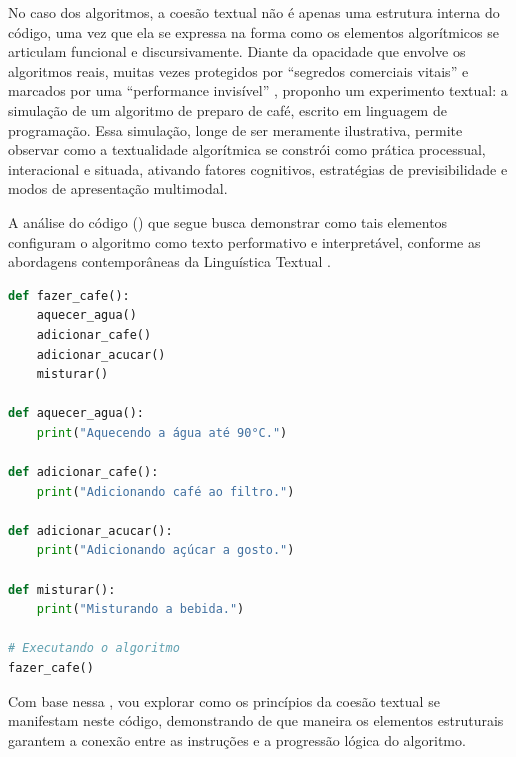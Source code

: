 \documentclass[portuguese]{textolivre}
\begin{document}
No caso dos algoritmos, a coesão textual não é apenas uma estrutura interna do código, uma vez que  ela se expressa na forma como os elementos algorítmicos se articulam funcional e discursivamente. Diante da opacidade que envolve os algoritmos reais, muitas vezes protegidos por “segredos comerciais vitais” \cite[p. 208]{oneil2020} e marcados por uma “performance invisível” \cite[p. 12]{santaella2023}, proponho um experimento textual: a simulação de um algoritmo de preparo de café, escrito em linguagem de programação. Essa simulação, longe de ser meramente ilustrativa, permite observar como a textualidade algorítmica se constrói como prática processual, interacional e situada, ativando fatores cognitivos, estratégias de previsibilidade e modos de apresentação multimodal.

A análise do código () que segue busca demonstrar como tais elementos configuram o algoritmo como texto performativo e interpretável, conforme as abordagens contemporâneas da Linguística Textual \cite{koch2006,marcuschi2008,beaugrande1997}.


\begin{lstlisting}[language=Python, label=fig2, caption={Algoritmo de preparo de café representado em linguagem de programação.}, source={Elaborado pelo autor via simulação por IA.}]
def fazer_cafe():
    aquecer_agua()
    adicionar_cafe()
    adicionar_acucar()
    misturar()

def aquecer_agua():
    print("Aquecendo a água até 90°C.")

def adicionar_cafe():
    print("Adicionando café ao filtro.")

def adicionar_acucar():
    print("Adicionando açúcar a gosto.")

def misturar():
    print("Misturando a bebida.")

# Executando o algoritmo
fazer_cafe()
\end{lstlisting}

Com base nessa , vou explorar como os princípios da coesão textual se manifestam neste código, demonstrando de que maneira os elementos estruturais garantem a conexão entre as instruções e a progressão lógica do algoritmo.
\end{document}
